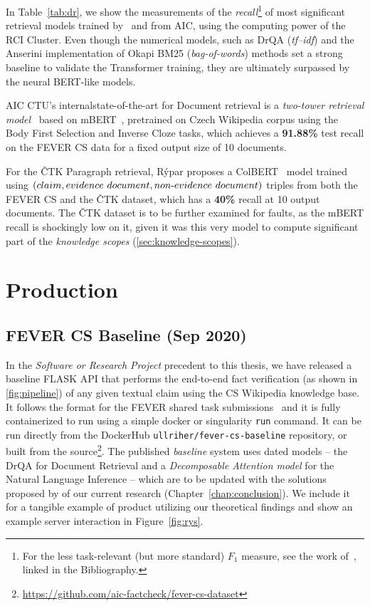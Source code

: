 In Table~\ref{tab:dr}, we show the measurements of the \textit{recall}\footnote{For the less task-relevant (but more standard) $F_1$ measure, see the work of~\cite{rypar}, linked in the Bibliography.} of most significant retrieval models trained by~\cite{rypar} and \cite{michal} from \textsf{AIC}, using the computing power of the \textsf{RCI Cluster}. Even though the numerical models, such as \textsf{DrQA} (\textit{tf--idf}) and the \textsf{Anserini} implementation of \textsf{Okapi BM25} (\textit{bag-of-words})  methods set a strong baseline to validate the Transformer training, they are ultimately surpassed by the neural \textsf{BERT}-like models.


\textsf{AIC CTU}'s internalstate-of-the-art for Document retrieval is a \textit{two-tower retrieval model}~\cite{twotower} based on \textsf{mBERT}~\cite{devlin2019bert}, pretrained on Czech \textsf{Wikipedia} corpus using the Body First Selection and Inverse Cloze tasks, which achieves a \textbf{91.88\%} test recall on the \textsf{FEVER CS} data for a fixed output size of 10 documents.

For the \textsf{ČTK Paragraph} retrieval, Rýpar proposes a \textsf{ColBERT}~\cite{colbert} model trained using $(claim,evidence~document,non{\text -}evidence~document)$ triples from both the \textsf{FEVER CS} and the \textsf{ČTK} dataset, which has a \textbf{40\%} recall at 10 output documents. The \textsf{ČTK} dataset is to be further examined for faults, as the \textsf{mBERT} recall is shockingly low on it, given it was this very model to compute significant part of the \textit{knowledge scopes} (\ref{sec:knowledge-scopes}).

\section{Production}
\subsection[FEVER CS Baseline]{FEVER CS Baseline (Sep 2020)}

In the \textit{Software or Research Project} precedent to this thesis, we have released a baseline \textsf{FLASK} \textsf{API} that performs the end-to-end fact verification (as shown in \ref{fig:pipeline}) of any given textual claim using the \textsf{CS Wikipedia} knowledge base. It follows the format for the \textsf{FEVER} shared task submissions~\cite{fever1} and it is fully containerized to run using a simple \textsf{docker} or \textsf{singularity} \texttt{run} command. It can be run directly from the \textsf{DockerHub}  \texttt{ullriher/fever-cs-baseline} repository, or built from the source\footnote{\url{https://github.com/aic-factcheck/fever-cs-dataset}}. The published \textit{baseline} system uses dated models -- the \textsf{DrQA} for Document Retrieval and a \textit{Decomposable Attention model} for the Natural Language Inference -- which are to be updated with the solutions proposed by of our current research (Chapter~\ref{chap:conclusion}). We include it for a tangible example of product utilizing our theoretical findings and show an example server interaction in Figure~\ref{fig:rys}.

